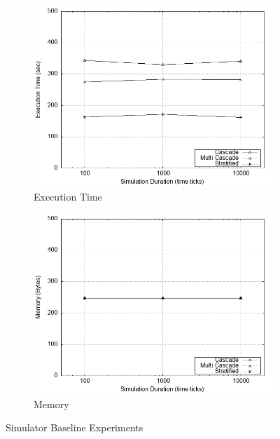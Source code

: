 \documentclass[logo,msc,cyber]{infthesis}   %
\begin{document}
\begin{figure}[h!]
    \hfill
    \begin{subfigure}[b]{0.45\textwidth}
        \centering
        \includegraphics[width=\textwidth]{figures/baseline_simulation/simulator/baseline_simulator_time.png}
        \caption{Execution Time}
        \label{fig:baseline-time}
    \end{subfigure}
    \hfill
    \begin{subfigure}[b]{0.45\textwidth}
        \centering
        \includegraphics[width=\textwidth]{figures/baseline_simulation/simulator/baseline_simulator_mem.png}
        \caption{Memory}
        \label{fig:baseline-mem}
    \end{subfigure}
       \caption{Simulator Baseline Experiments}
       \label{fig:baseline-simulation}
 \end{figure}
 
\end{document}

